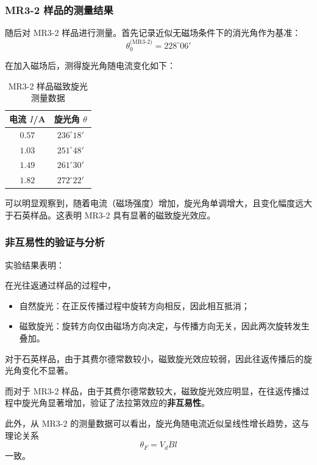 \documentclass[a4paper, 1.5lines]{ctexart}
\begin{document}
\subsubsection{MR3-2 样品的测量结果}

随后对 MR3-2 样品进行测量。首先记录近似无磁场条件下的消光角作为基准：
\begin{equation*}
    \theta_0^{\text{(MR3-2)}} = 228^\circ 06'
\end{equation*}

在加入磁场后，测得旋光角随电流变化如下：
\begin{table}[h!]
    \centering
    \begin{tabular}{cc}
        \toprule
        电流 $I$/A & 旋光角 $\theta$ \\
        \midrule
        $0.57$ & $236^\circ 18'$ \\
        $1.03$ & $251^\circ 48'$ \\
        $1.49$ & $261^\circ 30'$ \\
        $1.82$ & $272^\circ 22'$ \\
        \bottomrule
    \end{tabular}
    \caption{MR3-2 样品磁致旋光测量数据}
\end{table}

可以明显观察到，随着电流（磁场强度）增加，旋光角单调增大，且变化幅度远大于石英样品。这表明 MR3-2 具有显著的磁致旋光效应。

\subsubsection{非互易性的验证与分析}

实验结果表明：

在光往返通过样品的过程中，
\begin{itemize}
    \item 自然旋光：在正反传播过程中旋转方向相反，因此相互抵消；
    \item 磁致旋光：旋转方向仅由磁场方向决定，与传播方向无关，因此两次旋转发生叠加。
\end{itemize}

对于石英样品，由于其费尔德常数较小，磁致旋光效应较弱，因此往返传播后的旋光角变化不显著。

而对于 MR3-2 样品，由于其费尔德常数较大，磁致旋光效应明显，在往返传播过程中旋光角显著增加，验证了法拉第效应的\textbf{非互易性}。

此外，从 MR3-2 的测量数据可以看出，旋光角随电流近似呈线性增长趋势，这与理论关系
\begin{equation}
    \theta_F = V_d B l
\end{equation}
一致。
\end{document}
